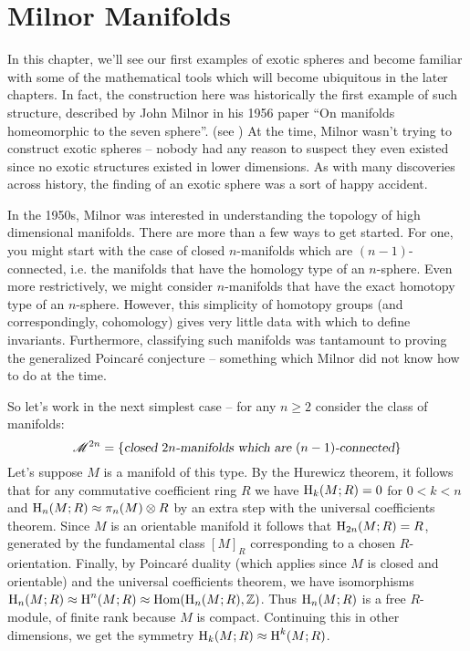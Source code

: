 \chapter{Milnor Manifolds}\label{ch:milnor}

In this chapter, we'll see our first examples of exotic spheres and become familiar with some of the mathematical tools which will become ubiquitous in the later chapters. 
In fact, the construction here was historically the first example of such structure, described by John Milnor in his 1956 paper ``On manifolds homeomorphic to the seven sphere''. (see \cite{milnor1956manifolds}) At the time, Milnor wasn't trying to construct exotic spheres -- nobody had any reason to suspect they even existed since no exotic structures existed in lower dimensions. As with many discoveries across history, the finding of an exotic sphere was a sort of happy accident.

In the 1950s, Milnor was interested in understanding the topology of high dimensional manifolds. There are more than a few ways to get started. For one, you might start with the case of closed $n$-manifolds which are $(n-1)$-connected, i.e. the manifolds that have the homology type of an $n$-sphere. Even more restrictively, we might consider $n$-manifolds that have the exact homotopy type of an $n$-sphere. However, this simplicity of homotopy groups (and correspondingly, cohomology) gives very little data with which to define invariants. Furthermore, classifying such manifolds was tantamount to proving the generalized Poincar\'e conjecture -- something which Milnor did not know how to do at the time.

So let's work in the next simplest case -- for any $n\geq 2$ consider the class of manifolds: 
\[\mathscr{M}^{2n} = \left\{\textsl{closed $2n$-manifolds which are $(n-1)$-connected}\right\}\]
Let's suppose $M$ is a manifold of this type. By the Hurewicz theorem, it follows that for any commutative coefficient ring $R$ we have $\operatorname{H}_k(M; R)=0$ for $0<k<n$ and $\operatorname{H}_n(M; R)\approx \pi_n(M)\otimes R$ by an extra step with the universal coefficients theorem. Since $M$ is an orientable manifold it follows that $\operatorname{H}_{2n}(M; R)=R$, generated by the fundamental class $[M]_R$ corresponding to a chosen $R$-orientation. 
Finally, by Poincar\'e duality (which applies since $M$ is closed and orientable) and the universal coefficients theorem, we have isomorphisms $\operatorname{H}_n(M; R)\approx \operatorname{H}^n(M; R)\approx \operatorname{Hom}(\operatorname{H}_n(M; R), \mathbb{Z})$. Thus $\operatorname{H}_n(M;R)$ is a free $R$-module, of finite rank because $M$ is compact. Continuing this in other dimensions, we get the symmetry $\operatorname{H}_k(M; R)\approx \operatorname{H}^k(M; R)$.

